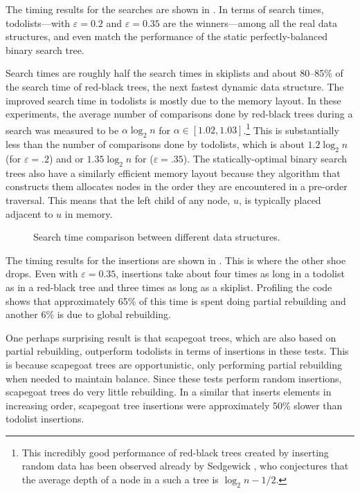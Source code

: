 \documentclass[lotsofwhite]{patmorin}
\newcommand{\eps}{\varepsilon}
\begin{document}
The timing results for the searches are shown in . In
terms of search times, todolists---with $\eps = 0.2$ and $\eps=0.35$
are the winners---among all the real data structures, and even match
the performance of the static perfectly-balanced binary search tree.

Search times are roughly half the search times in skiplists and about
80--85\% of the search time of red-black trees, the next fastest dynamic
data structure.  The improved search time in todolists is mostly due
to the memory layout.  In these experiments, the average number of
comparisons done by red-black trees during a search was measured to be
$\alpha\log_2 n$ for $\alpha\in[1.02,1.03]$.\footnote{This incredibly
good performance of red-black trees created by inserting random data
has been observed already by Sedgewick \cite{sedgewick:left-leaning},
who conjectures that the average depth of a node in a such a tree is
$\log_2 n-1/2$.} This is substantially less than the number of comparisons
done by todolists, which is about $1.2\log_2 n$ (for $\eps=.2$) and or
$1.35\log_2 n$ for ($\eps=.35$). The statically-optimal binary search
trees also have a similarly efficient memory layout because they algorithm
that constructs them allocates nodes in the order they are encountered
in a pre-order traversal. This means that the left child of any node,
$u$, is typically placed adjacent to $u$ in memory.

\begin{figure}
  \centering{}
  \caption{Search time comparison between different data structures.}
\end{figure}

The timing results for the insertions are shown in
. This is where the other shoe drops.  Even with
$\eps=0.35$, insertions take about four times as long in a todolist as in
a red-black tree and three times as long as a skiplist.  Profiling the
code shows that approximately 65\% of this time is spent doing partial
rebuilding and another 6\% is due to global rebuilding.

One perhaps surprising result is that scapegoat trees, which are also
based on partial rebuilding, outperform todolists in terms of insertions
in these tests.  This is because scapegoat trees are opportunistic,
only performing partial rebuilding when needed to maintain balance.
Since these tests perform random insertions, scapegoat trees do very
little rebuilding.  In a similar that inserts elements in increasing
order, scapegoat tree insertions were approximately 50\% slower than
todolist insertions.
\end{document}
